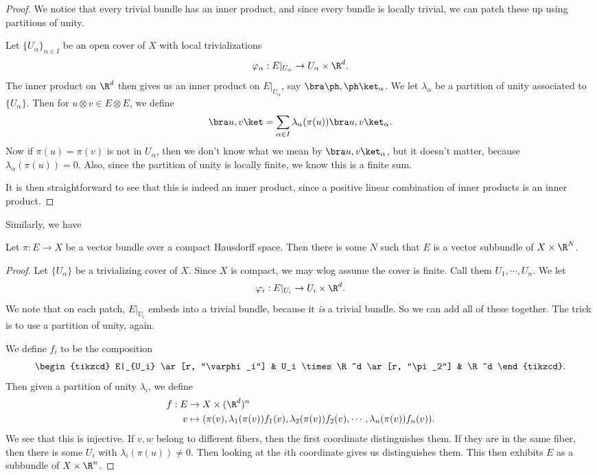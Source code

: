 \documentclass[a4paper]{article}
\theoremstyle{definition}
\begin{document}
\begin{proof}
  We notice that every trivial bundle has an inner product, and since every bundle is locally trivial, we can patch these up using partitions of unity.

  Let $\{U_\alpha\}_{\alpha \in I}$ be an open cover of $X$ with local trivializations
  \[
    \varphi_\alpha: E|_{U_\alpha} \to U_\alpha \times \R^d.
  \]
  The inner product on $\R^d$ then gives us an inner product on $E|_{U_\alpha}$, say $\bra \ph, \ph\ket_\alpha$. We let $\lambda_\alpha$ be a partition of unity associated to $\{U_\alpha\}$. Then for $u\otimes v \in E \otimes E$, we define
  \[
    \bra u, v\ket = \sum_{\alpha \in I} \lambda_\alpha(\pi(u)) \bra u, v\ket_\alpha.
  \]
  Now if $\pi(u) = \pi(v)$ is not in $U_\alpha$, then we don't know what we mean by $\bra u, v\ket_\alpha$, but it doesn't matter, because $\lambda_\alpha(\pi(u)) = 0$. Also, since the partition of unity is locally finite, we know this is a finite sum.

  It is then straightforward to see that this is indeed an inner product, since a positive linear combination of inner products is an inner product.
\end{proof}

Similarly, we have
\begin{lemma}
  Let $\pi: E \to X$ be a vector bundle over a compact Hausdorff space. Then there is some $N$ such that $E$ is a vector subbundle of $X \times \R^N$.
\end{lemma}

\begin{proof}
   Let $\{U_\alpha\}$ be a trivializing cover of $X$. Since $X$ is compact, we may wlog assume the cover is finite. Call them $U_1, \cdots, U_n$. We let
  \[
    \varphi_i: E|_{U_i} \to U_i \times \R^d.
  \]
  We note that on each patch, $E|_{U_i}$ embeds into a trivial bundle, because it \emph{is} a trivial bundle. So we can add all of these together. The trick is to use a partition of unity, again.

  We define $f_i$ to be the composition
  \[
    \begin{tikzcd}
      E|_{U_i} \ar[r, "\varphi_i"] & U_i \times \R^d \ar[r, "\pi_2"] & \R^d
    \end{tikzcd}.
  \]
  Then given a partition of unity $\lambda_i$, we define
  \begin{align*}
    f: E &\to X \times (\R^d)^n\\
    v&\mapsto (\pi(v), \lambda_1(\pi(v)) f_1(v), \lambda_2(\pi(v)) f_2(v), \cdots, \lambda_n(\pi(v)) f_n(v)).
  \end{align*}
  We see that this is injective. If $v, w$ belong to different fibers, then the first coordinate distinguishes them. If they are in the same fiber, then there is some $U_i$ with $\lambda_i(\pi(u)) \not= 0$. Then looking at the $i$th coordinate gives us distinguishes them. This then exhibits $E$ as a subbundle of $X \times \R^n$.
\end{proof}
\end{document}
